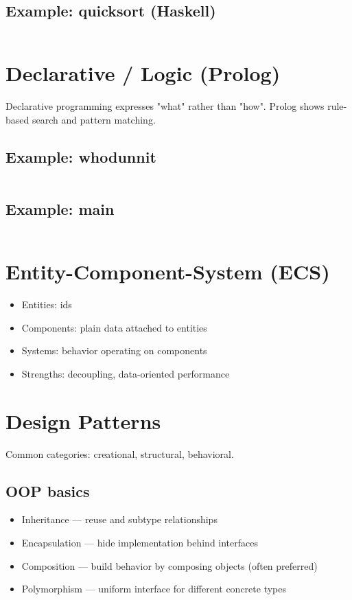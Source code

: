\documentclass{article}
\begin{document}
\subsection*{Example: quicksort (Haskell)}
\inputminted[linenos,fontsize=\small]{haskell}{../../haskell-playground/src/Quicksort.hs}

\pagebreak

\section{Declarative / Logic (Prolog)}
Declarative programming expresses "what" rather than "how". Prolog shows rule-based search and pattern matching.

\subsection*{Example: whodunnit}
\inputminted[linenos,fontsize=\small]{prolog}{../../prolog-playground/src/whodunnit.pl}

\subsection*{Example: main}
\inputminted[linenos,fontsize=\small]{prolog}{../../prolog-playground/src/main.pl}

\pagebreak

\section{Entity-Component-System (ECS)}
\begin{itemize}
  \item Entities: ids
  \item Components: plain data attached to entities
  \item Systems: behavior operating on components
  \item Strengths: decoupling, data-oriented performance
\end{itemize}

\pagebreak

\section{Design Patterns}
Common categories: creational, structural, behavioral.

\subsection{OOP basics}
\begin{itemize}
  \item Inheritance — reuse and subtype relationships
  \item Encapsulation — hide implementation behind interfaces
  \item Composition — build behavior by composing objects (often preferred)
  \item Polymorphism — uniform interface for different concrete types
\end{itemize}
\end{document}
